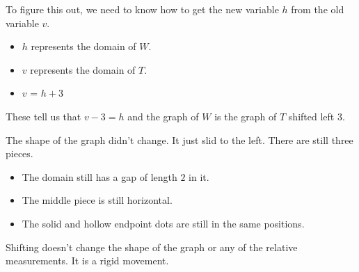 \documentclass{ximera}
\begin{document}
\begin{example}
To figure this out, we need to know how to get the new variable $h$ from the old variable $v$. \\




\begin{itemize}
\item $h$ represents the domain of $W$. 
\item $v$ represents the domain of $T$.  
\item $v$ = $h+3$
\end{itemize}


These tell us that $v-3 = h$ and the graph of $W$ is the graph of $T$ shifted left $3$.



\end{example}


The shape of the graph didn't change. It just slid to the left. There are still three pieces. \\




\begin{itemize}
\item The domain still has a gap of length $2$ in it.  
\item The middle piece is still horizontal.  
\item The solid and hollow endpoint dots are still in the same positions. 
\end{itemize}





Shifting doesn't change the shape of the graph or any of the relative measurements. It is a rigid movement.
\end{document}
